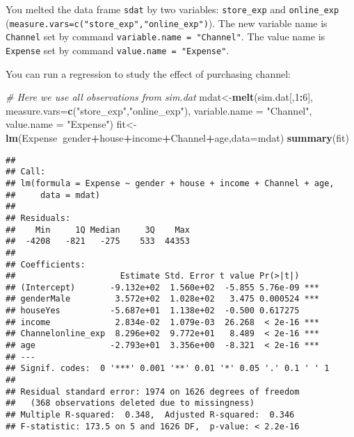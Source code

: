\documentclass[
]{article}
\newenvironment{Shaded}{\begin{snugshade}}{\end{snugshade}}
\newcommand{\CommentTok}[1]{\textcolor[rgb]{0.56,0.35,0.01}{\textit{#1}}}
\newcommand{\DataTypeTok}[1]{\textcolor[rgb]{0.13,0.29,0.53}{#1}}
\newcommand{\DecValTok}[1]{\textcolor[rgb]{0.00,0.00,0.81}{#1}}
\newcommand{\KeywordTok}[1]{\textcolor[rgb]{0.13,0.29,0.53}{\textbf{#1}}}
\newcommand{\NormalTok}[1]{#1}
\newcommand{\OperatorTok}[1]{\textcolor[rgb]{0.81,0.36,0.00}{\textbf{#1}}}
\newcommand{\StringTok}[1]{\textcolor[rgb]{0.31,0.60,0.02}{#1}}
\begin{document}
You melted the data frame \texttt{sdat} by two variables:
\texttt{store\_exp} and \texttt{online\_exp}
(\texttt{measure.vars=c("store\_exp","online\_exp")}). The new variable
name is \texttt{Channel} set by command
\texttt{variable.name\ =\ "Channel"}. The value name is \texttt{Expense}
set by command \texttt{value.name\ =\ "Expense"}.

You can run a regression to study the effect of purchasing channel:

\begin{Shaded}
\begin{Highlighting}[]
\CommentTok{# Here we use all observations from sim.dat}
\NormalTok{mdat<-}\KeywordTok{melt}\NormalTok{(sim.dat[,}\DecValTok{1}\OperatorTok{:}\DecValTok{6}\NormalTok{], }\DataTypeTok{measure.vars=}\KeywordTok{c}\NormalTok{(}\StringTok{"store_exp"}\NormalTok{,}\StringTok{"online_exp"}\NormalTok{),}
            \DataTypeTok{variable.name =} \StringTok{"Channel"}\NormalTok{,}
              \DataTypeTok{value.name =} \StringTok{"Expense"}\NormalTok{)}
\NormalTok{fit<-}\KeywordTok{lm}\NormalTok{(Expense}\OperatorTok{~}\NormalTok{gender}\OperatorTok{+}\NormalTok{house}\OperatorTok{+}\NormalTok{income}\OperatorTok{+}\NormalTok{Channel}\OperatorTok{+}\NormalTok{age,}\DataTypeTok{data=}\NormalTok{mdat)}
\KeywordTok{summary}\NormalTok{(fit)}
\end{Highlighting}
\end{Shaded}

\begin{verbatim}
## 
## Call:
## lm(formula = Expense ~ gender + house + income + Channel + age, 
##     data = mdat)
## 
## Residuals:
##    Min     1Q Median     3Q    Max 
##  -4208   -821   -275    533  44353 
## 
## Coefficients:
##                     Estimate Std. Error t value Pr(>|t|)    
## (Intercept)       -9.132e+02  1.560e+02  -5.855 5.76e-09 ***
## genderMale         3.572e+02  1.028e+02   3.475 0.000524 ***
## houseYes          -5.687e+01  1.138e+02  -0.500 0.617275    
## income             2.834e-02  1.079e-03  26.268  < 2e-16 ***
## Channelonline_exp  8.296e+02  9.772e+01   8.489  < 2e-16 ***
## age               -2.793e+01  3.356e+00  -8.321  < 2e-16 ***
## ---
## Signif. codes:  0 '***' 0.001 '**' 0.01 '*' 0.05 '.' 0.1 ' ' 1
## 
## Residual standard error: 1974 on 1626 degrees of freedom
##   (368 observations deleted due to missingness)
## Multiple R-squared:  0.348,  Adjusted R-squared:  0.346 
## F-statistic: 173.5 on 5 and 1626 DF,  p-value: < 2.2e-16
\end{verbatim}
\end{document}
